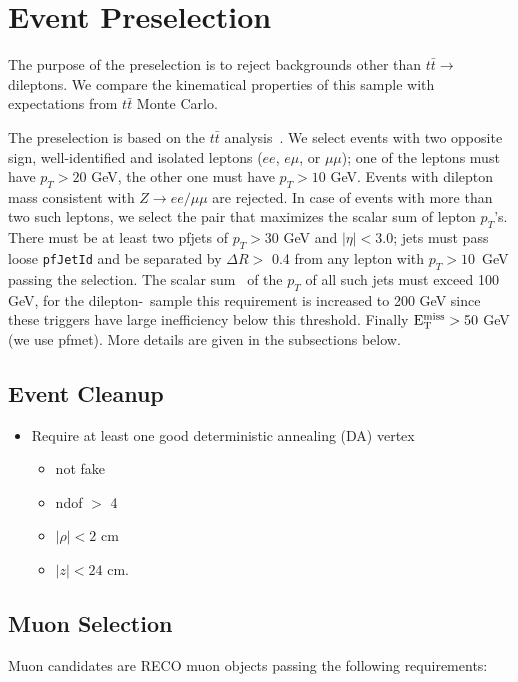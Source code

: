 \section{Event Preselection}
\label{sec:eventSel}
The purpose of the preselection is to reject backgrounds other than 
$t\bar{t} \to$ dileptons.  We compare the kinematical 
properties of this sample with expectations from $t\bar{t}$ 
Monte Carlo.

The preselection is based on the 
$t\bar{t}$ analysis~\cite{ref:top}.  
We select events with two opposite sign, well-identified and isolated
leptons ($ee$, $e\mu$, or $\mu\mu$); one of the leptons must 
have $p_T > 20$ GeV,
the other one must have $p_T > 10$ GeV. Events with dilepton mass
consistent with $Z \to ee/\mu\mu$ are rejected.
In case of events with 
more than two such leptons, we select the pair that maximizes the scalar 
sum of lepton $p_T$'s.
There must be at least two 
pfjets of $p_T > 30$ GeV and $|\eta| < 3.0$;  jets must pass
loose {\tt pfJetId} and be separated by $\Delta R >$ 0.4 from any 
lepton with $p_T > 10$~GeV passing the selection.
The scalar sum \Ht\ of the 
$p_T$ of all such jets must exceed 100 GeV, for the dilepton-\Ht\ sample
this requirement is increased to 200 GeV since these triggers have large inefficiency
below this threshold.
Finally $\rm E_{T}^{miss} > 50$ GeV (we use pfmet). More details are given in the subsections below.

\subsection{Event Cleanup}
\label{sec:cleanup}

\begin{itemize}
   \item Require at least one good deterministic annealing (DA) vertex
   \begin{itemize}
      \item not fake
      \item ndof $>$ 4
      \item $|\rho| < 2$ cm
      \item $|z| < 24$ cm.  
   \end{itemize}
\end{itemize}


\subsection{Muon Selection}
\label{sec:muon}

Muon candidates are RECO muon objects passing the following
requirements:

